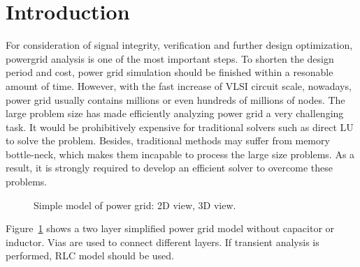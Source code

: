 \documentclass{sig-alternate}
\begin{document}
\section{Introduction}
	For consideration of signal integrity, verification and further design optimization, powergrid analysis is one of the most 
	important steps. To shorten the design period and cost, power grid simulation should be finished within a resonable amount
	of time. 
	However, with the fast increase of VLSI circuit scale, nowadays, power grid usually contains millions or even hundreds 
	of millions of nodes. The large problem size has made efficiently analyzing power grid a very challenging task. 
	It would be prohibitively expensive for traditional solvers such as direct LU to solve the problem. Besides, traditional 
	methods may suffer from memory bottle-neck, which makes them incapable to process the large size problems. As a result, 
	it is strongly required to develop an efficient solver to overcome these problems.\\
	\begin{figure}[htbp]
	  \caption{Simple model of power grid: 
	   2D view,
	   3D view.}
	  \label{pg_model}
	\end{figure}

	Figure~\ref{pg_model} shows a two layer simplified power grid model without capacitor or inductor. Vias are used to 
	connect different layers. If transient analysis is performed, RLC model should be used.\\ 
\end{document}
